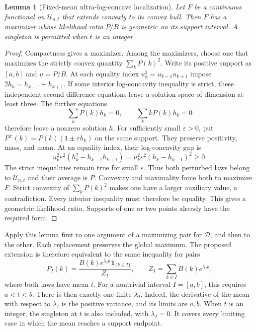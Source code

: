 \documentclass[11pt,a4paper]{article}
\newtheorem{lemma}[theorem]{Lemma}
\theoremstyle{definition}
\theoremstyle{remark}
\begin{document}
\begin{lemma}[Fixed-mean ultra-log-concave localization]\label{lem:r2-ulc-localization}
Let $F$ be a continuous functional on $\mathcal U_{n,t}$ that extends convexly to its convex hull.
Then $F$ has a maximizer whose likelihood ratio $P/B$ is geometric on its support interval.
A singleton is permitted when $t$ is an integer.
\end{lemma}

\begin{proof}
Compactness gives a maximizer.
Among the maximizers, choose one that maximizes the strictly convex quantity $\sum_kP(k)^2$.
Write its positive support as $[a,b]$ and $u=P/B$.
At each equality index $u_k^2=u_{k-1}u_{k+1}$ impose
$2h_k=h_{k-1}+h_{k+1}$.
If some interior log-concavity inequality is strict, these independent second-difference equations leave a solution space of dimension at least three.
The further equations
\[
 \sum_kP(k)h_k=0,\qquad \sum_k kP(k)h_k=0
\]
therefore leave a nonzero solution $h$.
For sufficiently small $\varepsilon>0$, put $P^\pm(k)=P(k)(1\pm\varepsilon h_k)$ on the same support.
They preserve positivity, mass, and mean.
At an equality index, their log-concavity gap is
\[
 u_k^2\varepsilon^2(h_k^2-h_{k-1}h_{k+1})
 =u_k^2\varepsilon^2(h_k-h_{k-1})^2\ge0.
\]
The strict inequalities remain true for small $\varepsilon$.
Thus both perturbed laws belong to $\mathcal U_{n,t}$ and their average is $P$.
Convexity and maximality force both to maximize $F$.
Strict convexity of $\sum_kP(k)^2$ makes one have a larger auxiliary value, a contradiction.
Every interior inequality must therefore be equality.
This gives a geometric likelihood ratio.
Supports of one or two points already have the required form.
\end{proof}

Apply this lemma first to one argument of a maximizing pair for $\mathcal D$, and then to the other.
Each replacement preserves the global maximum.
The proposed extension is therefore equivalent to the same inequality for pairs
\begin{equation}\label{eq:r2-tilted-interval}
 P_I(k)=\frac{B(k)e^{\lambda_I k}\mathbf1_{\{k\in I\}}}{Z_I},
 \qquad Z_I=\sum_{k\in I}B(k)e^{\lambda_I k},
\end{equation}
where both laws have mean $t$.
For a nontrivial interval $I=[a,b]$, this requires $a<t<b$.
There is then exactly one finite $\lambda_I$.
Indeed, the derivative of the mean with respect to $\lambda_I$ is the positive variance, and its limits are $a,b$.
When $t$ is an integer, the singleton at $t$ is also included, with $\lambda_I=0$.
It covers every limiting case in which the mean reaches a support endpoint.
\end{document}
